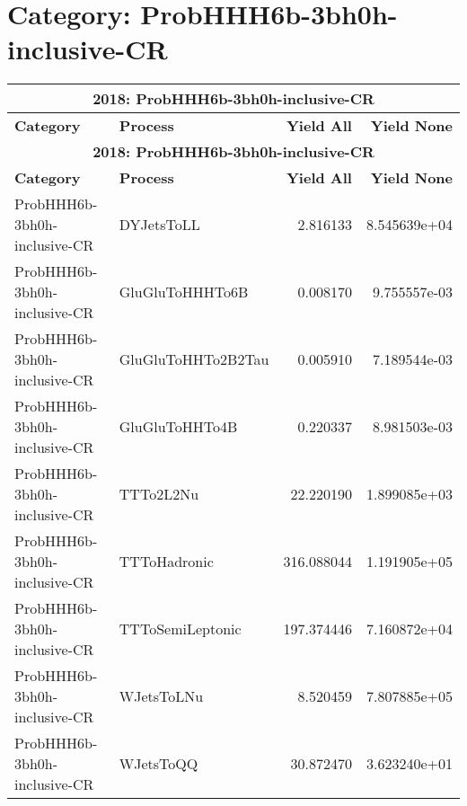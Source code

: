 \documentclass{article}
\begin{document}
\section*{Category: ProbHHH6b-3bh0h-inclusive-CR}
\begin{longtable}[c]{|l|l|r|r|}
\hline
\multicolumn{4}{|c|}{\textbf{2018: ProbHHH6b-3bh0h-inclusive-CR}} \\
\hline
\textbf{Category} & \textbf{Process} & \textbf{Yield All} & \textbf{Yield None} \\
\hline
\endfirsthead
\hline
\multicolumn{4}{|c|}{\textbf{2018: ProbHHH6b-3bh0h-inclusive-CR}} \\
\hline
\textbf{Category} & \textbf{Process} & \textbf{Yield All} & \textbf{Yield None} \\
\hline
\endhead
ProbHHH6b-3bh0h-inclusive-CR & DYJetsToLL & 2.816133 & 8.545639e+04 \\
\hline
ProbHHH6b-3bh0h-inclusive-CR & GluGluToHHHTo6B & 0.008170 & 9.755557e-03 \\
\hline
ProbHHH6b-3bh0h-inclusive-CR & GluGluToHHTo2B2Tau & 0.005910 & 7.189544e-03 \\
\hline
ProbHHH6b-3bh0h-inclusive-CR & GluGluToHHTo4B & 0.220337 & 8.981503e-03 \\
\hline
ProbHHH6b-3bh0h-inclusive-CR & TTTo2L2Nu & 22.220190 & 1.899085e+03 \\
\hline
ProbHHH6b-3bh0h-inclusive-CR & TTToHadronic & 316.088044 & 1.191905e+05 \\
\hline
ProbHHH6b-3bh0h-inclusive-CR & TTToSemiLeptonic & 197.374446 & 7.160872e+04 \\
\hline
ProbHHH6b-3bh0h-inclusive-CR & WJetsToLNu & 8.520459 & 7.807885e+05 \\
\hline
ProbHHH6b-3bh0h-inclusive-CR & WJetsToQQ & 30.872470 & 3.623240e+01 \\
\hline
\end{longtable}
\end{document}
